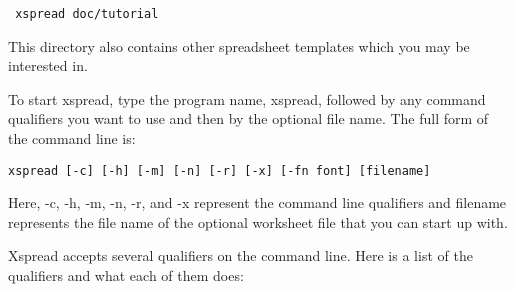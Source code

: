 \verb| xspread doc/tutorial|

This directory also contains other spreadsheet templates which you may be 
interested in.

    To start xspread, type the program name, xspread, followed by any command 
qualifiers you want to use and then by the optional file name.  The full form 
of the command line is:

{\tt   xspread [-c] [-h] [-m] [-n] [-r] [-x] [-fn font] [filename]}

Here, -c, -h, -m, -n, -r, and -x represent the command line qualifiers and 
filename represents the file name of the optional worksheet file that you can 
start up with.

    Xspread accepts several qualifiers on the command line.  Here is a list of
the qualifiers and what each of them does:
